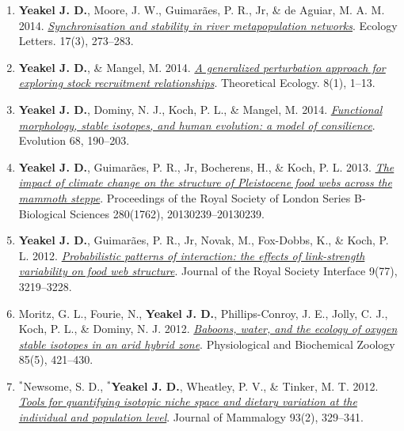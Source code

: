 \documentclass[margin,line,12pt]{res}
\begin{document}
\begin{resume}
\begin{enumerate}
\item \textbf{Yeakel J. D.}, Moore, J. W., Guimar\~aes, P. R., Jr, \& de Aguiar, M. A. M. 2014. \href{https://onlinelibrary.wiley.com/doi/abs/10.1111/ele.12228}{\emph{Synchronisation and stability in river metapopulation networks}}. Ecology Letters. 17(3), 273–283.

\item \textbf{Yeakel J. D.}, \& Mangel, M. 2014. \href{https://link.springer.com/article/10.1007/s12080-014-0230-z}{\emph{A generalized perturbation approach for exploring stock recruitment relationships}}. Theoretical Ecology. 8(1), 1–13.

\item \textbf{Yeakel J. D.}, Dominy, N. J., Koch, P. L., \& Mangel, M. 2014. \href{https://onlinelibrary.wiley.com/doi/full/10.1111/evo.12240}{\emph{Functional morphology, stable isotopes, and human evolution: a model of consilience}}. Evolution 68, 190–203.

\item \textbf{Yeakel J. D.}, Guimar\~aes, P. R., Jr, Bocherens, H., \& Koch, P. L. 2013. \href{https://royalsocietypublishing.org/doi/10.1098/rspb.2013.0239}{\emph{The impact of climate change on the structure of Pleistocene food webs across the mammoth steppe}}. Proceedings of the Royal Society of London Series B-Biological Sciences 280(1762), 20130239–20130239.

\item \textbf{Yeakel J. D.}, Guimar\~aes, P. R., Jr, Novak, M., Fox-Dobbs, K., \& Koch, P. L. 2012. \href{https://royalsocietypublishing.org/doi/10.1098/rsif.2012.0481}{\emph{Probabilistic patterns of interaction: the effects of link-strength variability on food web structure}}. Journal of the Royal Society Interface 9(77), 3219–3228.

\item Moritz, G. L., Fourie, N., \textbf{Yeakel J. D.}, Phillips-Conroy, J. E., Jolly, C. J., Koch, P. L., \& Dominy, N. J. 2012. \href{https://pubmed.ncbi.nlm.nih.gov/22902370/}{\emph{Baboons, water, and the ecology of oxygen stable isotopes in an arid hybrid zone}}. Physiological and Biochemical Zoology 85(5), 421–430.

\item ${}^\ast$Newsome, S. D., \textbf{${}^\ast$Yeakel J. D.}, Wheatley, P. V., \& Tinker, M. T. 2012. \href{https://academic.oup.com/jmammal/article/93/2/329/919625}{\emph{Tools for quantifying isotopic niche space and dietary variation at the individual and population level}}. Journal of Mammalogy 93(2), 329–341.


\end{enumerate}
\end{resume}
\end{document}

